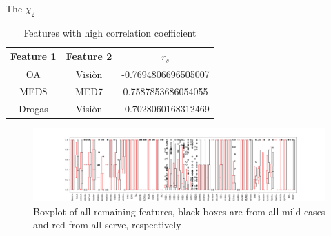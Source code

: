 \documentclass[11pt]{article}
\begin{document}
The $\chi_2$

\begin{table}[t]
\centering
\begin{tabular}{|c c|S|}
\hline
Feature 1 & Feature 2 & $r_s$ \\ \hline
OA&Visiòn&-0.7694806696505007\\
MED8&MED7& 0.7587853686054055\\
Drogas&Visiòn&-0.7028060168312469\\ \hline
\end{tabular}
\caption{Features with high correlation coefficient}
\label{table:corr}
\end{table}






\begin{figure}[t]
\includegraphics[width=\linewidth]{boxplot_serve_mild.png}
\caption{Boxplot of all remaining features, black boxes are from all mild cases and red from all serve, respectively}
\label{fig:boxplots}
\end{figure}


\printbibliography[heading=bibintoc, title={References}]
\end{document}
